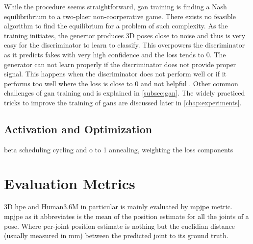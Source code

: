 While the procedure seems straightforward, \ac{gan} training is finding a Nash equilibribrium to a two-plaer non-coorperative game. There exists no feasible algorithm to find the equilibrium for a problem of such complexity\cite{improved_gan}. As the training initiates, the genertor produces 3D poses close to noise and thus is very easy for the discriminator to learn to classify. This overpowers the discriminator as it predicts fakes with very high confidence and the loss tends to 0. The generator can not learn properly if the discriminator does not provide proper signal. This happens when the discriminator does not perform well or if it performs too well where the loss is close to 0 and not helpful \cite{gan_wgan_tutorial}. Other common challenges of \ac{gan} training and  is explained in \ref{subsec:gan}. The widely practiced tricks to improve the training of \acp{gan} are discussed later in \ref{chap:experiments}.







\subsection{Activation and Optimization}
beta scheduling cycling and o to 1 annealing, weighting the loss components 

\section{Evaluation Metrics} %
3D \ac{hpe} and Human3.6M in particular is mainly evaluated by \ac{mpjpe} metric. \ac{mpjpe} as it abbreviates is the mean of the position estimate for all the joints of a pose. Where per-joint position estimate is nothing but the euclidian distance (usually measured in mm) between the predicted joint to its ground truth.





